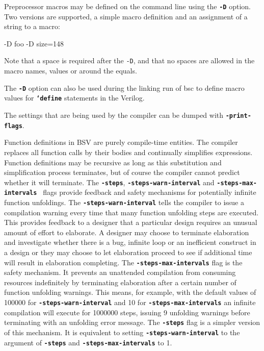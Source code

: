 \documentclass{article}
\newcommand{\te}[1]{\texttt{#1}}
\newenvironment{centerboxverbatim}
  {\center
   \boxedverbatim}
  {\endboxedverbatim
  {\endcenter }}
\begin{document}
Preprocessor macros may be defined on the command line using the
{\bf\tt -D} option.  Two versions are supported, a simple macro definition
and an assignment of a string to a macro:
\nopagebreak[4]
\index{-D@\te{-D} (compiler flag)}

\begin{centerboxverbatim}
-D foo
-D size=148
\end{centerboxverbatim}

Note that a space is required after the {\tt -D}, and that no spaces
are allowed in the macro names, values or around the equals.

The {\bf\tt -D} option can also be used during the linking run of bsc
to define macro values for {\bf \tt `define} statements in the Verilog.

The settings that are being used by the compiler can be dumped with
{\bf\tt -print-flags}.

Function definitions in BSV are purely compile-time entities.  The
compiler replaces all function calls by their bodies and continually
simplifies expressions. Function definitions may be recursive as long
as this substitution and simplification process terminates, but of
course the compiler cannot predict whether it will terminate. The
{\bf\tt -steps}, {\bf\tt -steps-warn-interval} and {\bf\tt -steps-max-intervals }
flags provide feedback and safety mechanisms for potentially infinite
function unfoldings. The {\bf\tt -steps-warn-interval} tells the compiler to
issue a compilation warning every time that many function unfolding steps are
executed. This provides feedback to a designer that a particular design requires
an unusual amount of effort to elaborate. A designer may choose to terminate
elaboration and investigate whether there is a bug, infinite loop or an
inefficient construct in a design or they may choose to let elaboration proceed
to see if additional time will result in elaboration completing. The
{\bf\tt -steps-max-intervals} flag is the safety mechanism. It prevents an
unattended compilation from consuming resources indefinitely by terminating
elaboration after a certain number of function unfolding warnings. This means, for example,
with the default values of 100000 for {\bf\tt -steps-warn-interval} and
10 for {\bf\tt -steps-max-intervals} an infinite compilation will execute for
1000000 steps, issuing 9 unfolding warnings before terminating with an unfolding
error message. The {\bf\tt -steps} flag  is a simpler version of this mechanism. It is
equivalent to setting  {\bf\tt -steps-warn-interval} to the argument of {\bf\tt -steps} and
{\bf\tt -steps-max-intervals} to 1.
\end{document}
